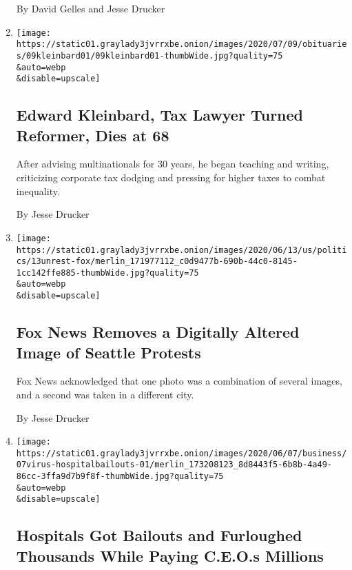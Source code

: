 \begin{enumerate}
  By David Gelles and Jesse Drucker
\item
  \href{/2020/07/10/business/dealbook/edward-kleinbard-dead.html}{}

  \texttt{[image: https://static01.graylady3jvrrxbe.onion/images/2020/07/09/obituaries/09kleinbard01/09kleinbard01-thumbWide.jpg?quality=75\\\&auto=webp\\\&disable=upscale]}

  \hypertarget{edward-kleinbard-tax-lawyer-turned-reformer-dies-at-68}{%
  \subsection{Edward Kleinbard, Tax Lawyer Turned Reformer, Dies at
  68}\label{edward-kleinbard-tax-lawyer-turned-reformer-dies-at-68}}

  After advising multinationals for 30 years, he began teaching and
  writing, criticizing corporate tax dodging and pressing for higher
  taxes to combat inequality.

  By Jesse Drucker
\item
  \href{/2020/06/13/business/media/fox-news-george-floyd-protests-seattle.html}{}

  \texttt{[image: https://static01.graylady3jvrrxbe.onion/images/2020/06/13/us/politics/13unrest-fox/merlin\_171977112\_c0d9477b-690b-44c0-8145-1cc142ffe885-thumbWide.jpg?quality=75\\\&auto=webp\\\&disable=upscale]}

  \hypertarget{fox-news-removes-a-digitally-altered-image-of-seattle-protests}{%
  \subsection{Fox News Removes a Digitally Altered Image of Seattle
  Protests}\label{fox-news-removes-a-digitally-altered-image-of-seattle-protests}}

  Fox News acknowledged that one photo was a combination of several
  images, and a second was taken in a different city.

  By Jesse Drucker
\item
  \href{/2020/06/08/business/hospitals-bailouts-ceo-pay.html}{}

  \texttt{[image: https://static01.graylady3jvrrxbe.onion/images/2020/06/07/business/07virus-hospitalbailouts-01/merlin\_173208123\_8d8443f5-6b8b-4a49-86cc-3ffa9d7b9f8f-thumbWide.jpg?quality=75\\\&auto=webp\\\&disable=upscale]}

  \hypertarget{hospitals-got-bailouts-and-furloughed-thousands-while-paying-ceos-millions}{%
  \subsection{Hospitals Got Bailouts and Furloughed Thousands While
  Paying C.E.O.s
  Millions}\label{hospitals-got-bailouts-and-furloughed-thousands-while-paying-ceos-millions}}


\end{enumerate}
